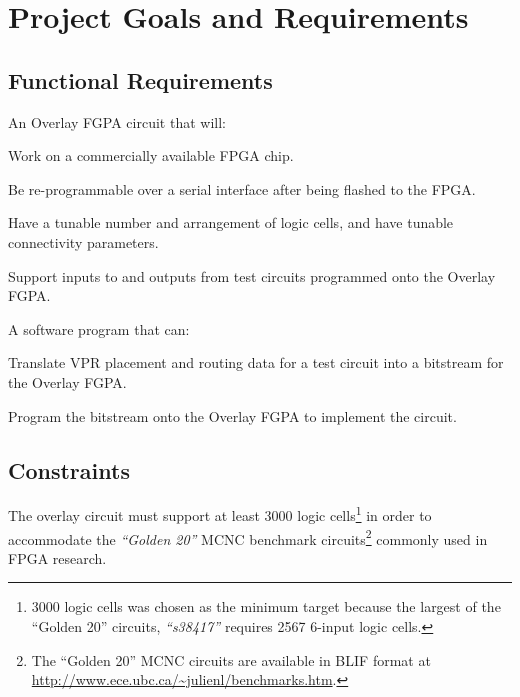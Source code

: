 \section{Project Goals and Requirements}
\label{goals}




\subsection{Functional Requirements}

An Overlay FGPA circuit that will:

\begin{itemlist}
	\item Work on a commercially available FPGA chip.
	\item Be re-programmable over a serial interface after being flashed to the FPGA.
	\item Have a tunable number and arrangement of logic cells, and have tunable connectivity parameters. 
	\item Support inputs to and outputs from test circuits programmed onto the Overlay FGPA.
\end{itemlist}

A software program that can:
\begin{itemlist}
	\item Translate VPR placement and routing data for a test circuit into a bitstream for the Overlay FGPA.
	\item Program the bitstream onto the Overlay FGPA to implement the circuit.
\end{itemlist}

\subsection{Constraints}

\begin{itemlist}
	\item The overlay circuit must support at least 3000 logic cells\footnote{3000 logic cells was chosen as the minimum target because the largest of the ``Golden 20'' circuits, \emph{``s38417''} requires 2567 6-input logic cells.} in order to accommodate the \emph{``Golden 20''} MCNC benchmark circuits\footnote{The ``Golden 20'' MCNC circuits are available in BLIF format at \url{http://www.ece.ubc.ca/~julienl/benchmarks.htm}.} commonly used in FPGA research.
\end{itemlist}


